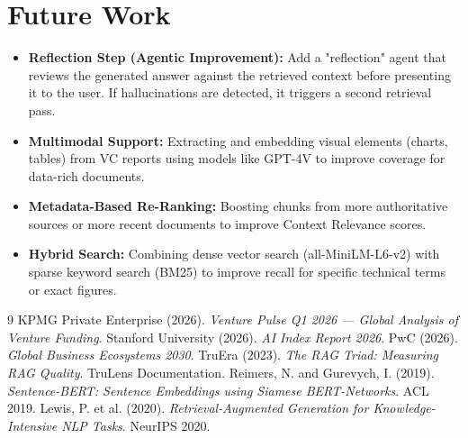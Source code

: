 \documentclass[11pt, a4paper]{article}
\begin{document}
\section{Future Work}

\begin{itemize}
    \item \textbf{Reflection Step (Agentic Improvement):} Add a "reflection" agent that reviews the generated answer against the retrieved context before presenting it to the user. If hallucinations are detected, it triggers a second retrieval pass.
    \item \textbf{Multimodal Support:} Extracting and embedding visual elements (charts, tables) from VC reports using models like GPT-4V to improve coverage for data-rich documents.
    \item \textbf{Metadata-Based Re-Ranking:} Boosting chunks from more authoritative sources or more recent documents to improve Context Relevance scores.
    \item \textbf{Hybrid Search:} Combining dense vector search (all-MiniLM-L6-v2) with sparse keyword search (BM25) to improve recall for specific technical terms or exact figures.
\end{itemize}

\begin{thebibliography}{9}
KPMG Private Enterprise (2026). \textit{Venture Pulse Q1 2026 — Global Analysis of Venture Funding}.
Stanford University (2026). \textit{AI Index Report 2026}.
PwC (2026). \textit{Global Business Ecosystems 2030}.
TruEra (2023). \textit{The RAG Triad: Measuring RAG Quality}. TruLens Documentation.
Reimers, N. and Gurevych, I. (2019). \textit{Sentence-BERT: Sentence Embeddings using Siamese BERT-Networks}. ACL 2019.
Lewis, P. et al. (2020). \textit{Retrieval-Augmented Generation for Knowledge-Intensive NLP Tasks}. NeurIPS 2020.
\end{thebibliography}
\end{document}
